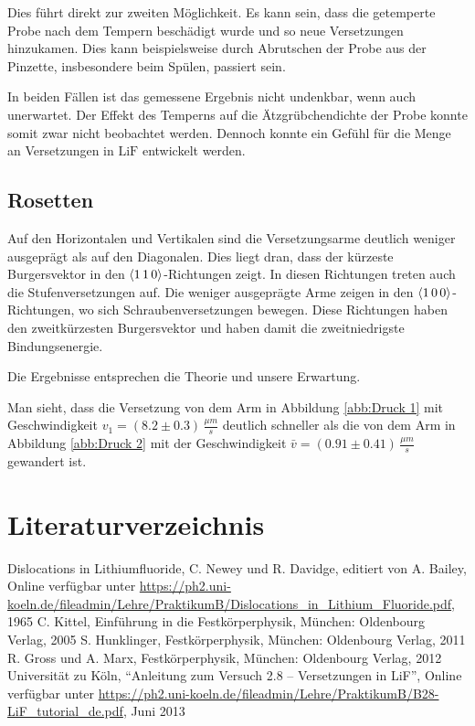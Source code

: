 \documentclass[12pt,a4paper]{scrartcl}
\numberwithin{equation}{section} %
\renewcommand{\[}{} %
\renewcommand{\]}{\noindent} %
\begin{document}
Dies führt direkt zur zweiten Möglichkeit. Es kann sein, dass die
getemperte Probe nach dem Tempern beschädigt wurde und so neue
Versetzungen hinzukamen. Dies kann beispielsweise durch Abrutschen der
Probe aus der Pinzette, insbesondere beim Spülen, passiert sein.

In beiden Fällen ist das gemessene Ergebnis nicht undenkbar, wenn auch
unerwartet. Der Effekt des Temperns auf die Ätzgrübchendichte der Probe
konnte somit zwar nicht beobachtet werden. Dennoch konnte ein Gefühl für
die Menge an Versetzungen in \(\mathrm{LiF}\) entwickelt werden.

\hypertarget{rosetten}{%
\subsection{Rosetten}\label{rosetten}}

Auf den Horizontalen und Vertikalen sind die Versetzungsarme deutlich
weniger ausgeprägt als auf den Diagonalen. Dies liegt dran, dass der
kürzeste Burgersvektor in den \(\expval{1\,1\,0}\)-Richtungen zeigt. In
diesen Richtungen treten auch die Stufenversetzungen auf. Die weniger
ausgeprägte Arme zeigen in den \(\expval{1\,0\,0}\)-Richtungen, wo sich
Schraubenversetzungen bewegen. Diese Richtungen haben den zweitkürzesten
Burgersvektor und haben damit die zweitniedrigste Bindungsenergie.

Die Ergebnisse entsprechen die Theorie und unsere Erwartung.

Man sieht, dass die Versetzung von dem Arm in Abbildung \ref{abb:Druck 1} mit
Geschwindigkeit \(v_1=(8.2 \pm 0.3) \,\frac{\mu m}{s}\) deutlich
schneller als die von dem Arm in Abbildung \ref{abb:Druck 2} mit der
Geschwindigkeit \(\bar{v}=(0.91 \pm 0.41) \,\frac{\mu m}{s}\) gewandert
ist.

\clearpage
\hypertarget{literaturverzeichnis}{%
	\section{Literaturverzeichnis}\label{literaturverzeichnis}}
\begin{thebibliography}{9}
	Dislocations in Lithiumfluoride, C. Newey und R. Davidge, editiert von
	A. Bailey, Online verfügbar unter
	\url{https://ph2.uni-koeln.de/fileadmin/Lehre/PraktikumB/Dislocations_in_Lithium_Fluoride.pdf},
	1965
	C. Kittel, Einführung in die Festkörperphysik, München: Oldenbourg Verlag, 2005
	S. Hunklinger, Festkörperphysik, München: Oldenbourg Verlag, 2011
	R. Gross und A. Marx, Festkörperphysik, München: Oldenbourg Verlag, 2012
	Universität zu Köln, ``Anleitung zum Versuch 2.8 -- Versetzungen in
	LiF'', Online verfügbar unter
	\url{https://ph2.uni-koeln.de/fileadmin/Lehre/PraktikumB/B28-LiF_tutorial_de.pdf},
	Juni 2013
\end{thebibliography}
\end{document}
